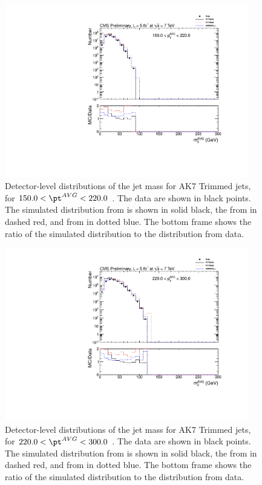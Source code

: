 \begin{figure}[htbp]
\centering
\includegraphics[width=0.95\textwidth]{figs/histAK7MjetVsPtAvg_rawDataMCComparisons_pt_3_Trimmed}
\caption{Detector-level distributions of the jet mass for AK7 Trimmed jets,
for $150.0 < \pt^{AVG} < 220.0$ \GeVc. The data are shown in black points.
The simulated distribution from \PYTHIA is shown in solid black, 
the from \PYTHIAEIGHT in dashed red, and from \HERWIG in dotted blue. 
The bottom frame shows the ratio of the simulated distribution
to the distribution from data. 
\label{figs:histAK7MjetVsPtAvg_rawDataMCComparisons_pt_3_Trimmed}}
\end{figure}



\begin{figure}[htbp]
\centering
\includegraphics[width=0.95\textwidth]{figs/histAK7MjetVsPtAvg_rawDataMCComparisons_pt_4_Trimmed}
\caption{Detector-level distributions of the jet mass for AK7 Trimmed jets,
for $220.0 < \pt^{AVG} < 300.0$ \GeVc. The data are shown in black points.
The simulated distribution from \PYTHIA is shown in solid black, 
the from \PYTHIAEIGHT in dashed red, and from \HERWIG in dotted blue. 
The bottom frame shows the ratio of the simulated distribution
to the distribution from data. 
\label{figs:histAK7MjetVsPtAvg_rawDataMCComparisons_pt_4_Trimmed}}
\end{figure}



